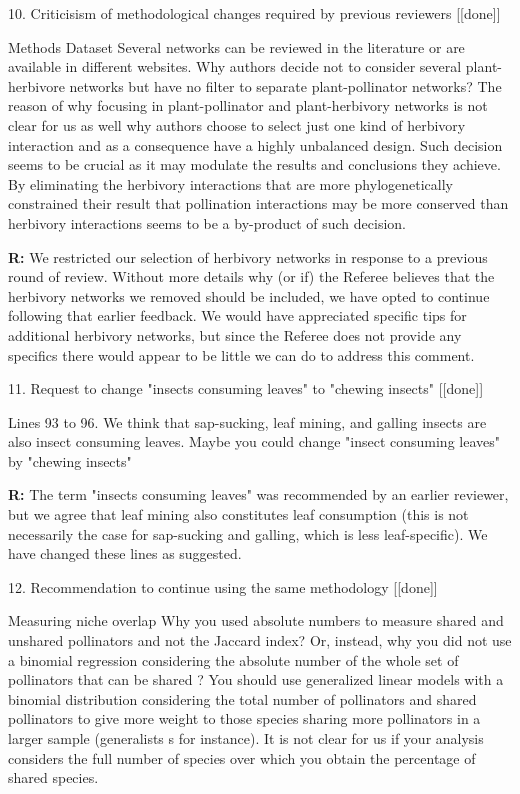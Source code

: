 \documentclass[12pt]{letter}
\newenvironment{refquote}{\bigskip \begin{it}}{\end{it}\smallskip}
\begin{document}
	10. Criticisism of methodological changes required by previous reviewers [[done]]

		\begin{refquote}
		Methods
		Dataset
		Several networks can be reviewed in the literature or are available in different websites. Why authors decide not to consider several plant-herbivore networks but have no filter to separate plant-pollinator networks? The reason of why focusing in plant-pollinator and plant-herbivory networks is not clear for us as well why authors choose to select just one kind of herbivory interaction and as a consequence have a highly unbalanced design. Such decision seems to be crucial as it may modulate the results and conclusions they achieve. By eliminating the herbivory interactions that are more phylogenetically constrained their result that pollination interactions may be more conserved than herbivory interactions seems to be a by-product of such decision.
		\end{refquote}


		\textbf{R:} We restricted our selection of herbivory networks in response to a previous round of review. Without more details why (or if) the Referee believes that the herbivory networks we removed should be included, we have opted to continue following that earlier feedback. We would have appreciated specific tips for additional herbivory networks, but since the Referee does not provide any specifics there would appear to be little we can do to address this comment.


	11. Request to change "insects consuming leaves" to "chewing insects" [[done]]

		\begin{refquote}
			Lines 93 to 96. We think that sap-sucking, leaf mining, and galling insects are also insect consuming leaves. Maybe you could change "insect consuming leaves" by "chewing insects"
		\end{refquote}

		\textbf{R:} The term "insects consuming leaves" was recommended by an earlier reviewer, but we agree that leaf mining also constitutes leaf consumption (this is not necessarily the case for sap-sucking and galling, which is less leaf-specific). We have changed these lines as suggested.


	12. Recommendation to continue using the same methodology [[done]]

		\begin{refquote}
			Measuring niche overlap
			Why you used absolute numbers to measure shared and unshared pollinators and not the Jaccard index? Or, instead, why you did not use a binomial regression considering the absolute number of the whole set of pollinators that can be shared ? You should use generalized linear models with a binomial distribution considering the total number of pollinators and shared pollinators to give more weight to those species sharing more pollinators in a larger sample (generalists s for instance). It is not clear for us if your analysis considers the full number of species over which you obtain the percentage of shared species.
		\end{refquote}
\end{document}
